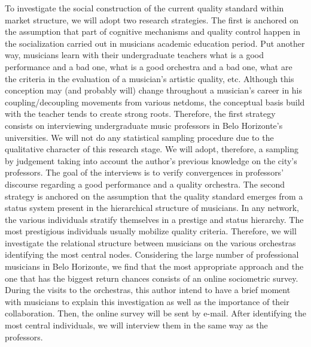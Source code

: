\documentclass[a4paper, 12pt, openright, oneside, german, french, brazil, english]{abntex2}
\begin{document}
	To investigate the social construction of the current quality standard within market structure, we will adopt two research strategies. The first is anchored on the assumption that part of cognitive mechanisms and quality control happen in the socialization carried out in musicians academic education period. Put another way, musicians learn with their undergraduate teachers what is a good performance and a bad one, what is a good orchestra and a bad one, what are the criteria in the evaluation of a musician's artistic quality, etc. Although this conception may (and probably will) change throughout a musician's career in his coupling/decoupling movements from various netdoms, the conceptual basis build with the teacher tends to create strong roots. Therefore, the first strategy consists on interviewing undergraduate music professors in Belo Horizonte's universities. We will not do any statistical sampling procedure due to the qualitative character of this research stage. We will adopt, therefore, a sampling by judgement taking into account the author's previous knowledge on the city's professors. The goal of the interviews is to verify convergences in professors' discourse regarding a good performance and a quality orchestra. The second strategy is anchored on the assumption that the quality standard emerges from a status system present in the hierarchical structure of musicians. In any network, the various individuals stratify themselves in a prestige and status hierarchy. The most prestigious individuals usually mobilize quality criteria. Therefore, we will investigate the relational structure between musicians on the various orchestras identifying the most central nodes. Considering the large number of professional musicians in Belo Horizonte, we find that the most appropriate approach and the one that has the biggest return chances consists of an online sociometric survey. During the visits to the orchestras, this author intend to have a brief moment with musicians to explain this investigation as well as the importance of their collaboration. Then, the online survey will be sent by e-mail. After identifying the most central individuals, we will interview them in the same way as the professors.
	
	
\end{document}
